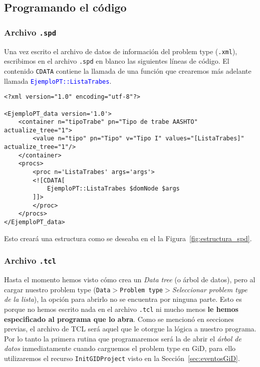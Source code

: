 \documentclass[10pt, a4paper, twocolumn]{article} %
\begin{document}
\subsection{Programando el código}

\subsubsection{Archivo \texttt{.spd}}

Una vez escrito el archivo de datos de información del problem type (\texttt{.xml}), escribimos en el archivo \texttt{.spd} en blanco las siguientes líneas de código. El contenido \texttt{CDATA} contiene la llamada de una función que crearemos más adelante llamada \textcolor{blue}{\texttt{EjemploPT::ListaTrabes}}.

\lstset{language=XML} 
\begin{lstlisting}
<?xml version="1.0" encoding="utf-8"?>

<EjemploPT_data version='1.0'>
	<container n="tipoTrabe" pn="Tipo de trabe AASHTO" actualize_tree="1">
		<value n="tipo" pn="Tipo" v="Tipo I" values="[ListaTrabes]" actualize_tree="1"/>
  	</container>
  	<procs>
    	<proc n='ListaTrabes' args='args'>
      	<![CDATA[
        	EjemploPT::ListaTrabes $domNode $args
      	]]>
    	</proc>
  	</procs>
</EjemploPT_data>
\end{lstlisting}

Esto creará una estructura como se deseaba en el la Figura~\ref{fig:estructura_spd}.

\subsubsection{Archivo \texttt{.tcl}}

Hasta el momento hemos visto cómo crea un \textit{Data tree} (o árbol de datos), pero al cargar nuestro problem type (\texttt{Data$>$Problem type$>$}\textit{Seleccionar problem type de la lista}), la opción para abrirlo no se encuentra por ninguna parte. Esto es porque no hemos escrito nada en el archivo \texttt{.tcl} ni mucho menos \textbf{le hemos especificado al programa que lo abra}. Como se mencionó en secciones previas, el archivo de TCL será aquel que le otorgue la lógica a nuestro programa. Por lo tanto la primera rutina que programaremos será la de abrir el \textit{árbol de datos} inmediatamente cuando carguemos el problem type en GiD, para ello utilizaremos el recurso \texttt{InitGIDProject} visto en la Sección~\ref{sec:eventosGiD}.
\end{document}
